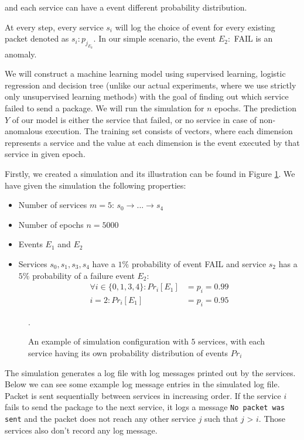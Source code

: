 and each service can have a event different probability distribution.

At every step, every service $s_i$ will log the choice of event for every existing packet denoted as $s_i: p_{j_{E_k}}$. In our simple scenario, the event $E_2:$ FAIL is an anomaly. 

We will construct a machine learning model using supervised learning, logistic regression and decision tree (unlike our actual experiments, where we use strictly only unsupervised learning methods) with the goal of finding out which service failed to send a package. We will run the simulation for $n$ epochs. The prediction $Y$ of our model is either the service that failed, or no service in case of non-anomalous execution. The training set consists of vectors, where each dimension represents a service and the value at each dimension is the event executed by that service in given epoch. 

Firstly, we created a simulation and its illustration can be found in Figure \ref{figure:simulation}. We have given the simulation the following properties: 

\begin{itemize}
    \item Number of services $m = 5$: $s_0 \rightarrow ... \rightarrow s_{4}$
    \item Number of epochs $n = 5000$
    \item Events $E_1$ and $E_2$
    \item Services $s_0, s_1, s_3, s_4$ have a $1\%$ probability of event FAIL and service $s_2$ has a $5\%$ probability of a failure event $E_2$:
    \begin{align*}
        \forall i \in \{0, 1, 3, 4\}: Pr_i[E_1] &= p_i = 0.99 \\
        i = 2: Pr_i[E_1] &= p_i = 0.95
    \end{align*}
\end{itemize}

\begin{figure}\centering
     
	\caption{An example of simulation configuration with $5$ services, with each service having its own probability distribution of events $Pr_i$}.
	\label{figure:simulation}
\end{figure}

The simulation generates a log file with log messages printed out by the services. Below we can see some example log message entries in the simulated log file. Packet is sent sequentially between services in increasing order. If the service $i$ fails to send the package to the next service, it logs a message \texttt{No packet was sent} and the packet does not reach any other service $j$ such that $j$ > $i$. Those services also don't record any log message. 

